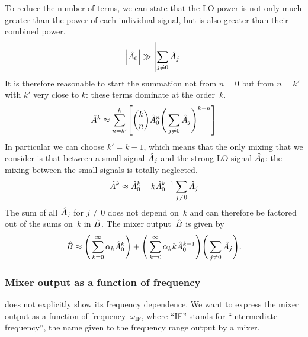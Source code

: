 To reduce the number of terms, we can state that the LO power is not only much greater than the power of each individual signal, but is also greater than their combined power.
\[
    \abs{\cp{A}_0} \gg \abs{\sum_{j \ne 0} \cp{A}_j}
\]
It is therefore reasonable to start the summation not from $n=0$ but from $n=k'$ with $k'$ very close to $k$: these terms dominate at the order~$k$.
\[
    \cp{A}^k
    \approx
    \sum_{n=k'}^{k}
    \left[
    \binom{k}{n} 
    \cp{A}_0^n 
    \Bigg(
        \sum_{j \ne 0}
        \cp{A}_j
    \Bigg)^{k-n}
    \right]
\]
In particular we can choose $k' = k-1$, which means that the only mixing that we consider is that between a small signal $\hat{A}_j$ and the strong LO signal $\hat{A}_0$: the mixing between the small signals is totally neglected.
\begin{equation}
    \hat{A}^k
    \approx
    \hat{A}_0^k
    +
    k
    \hat{A}_0^{k-1}
    \sum_{j \ne 0}
    \hat{A}_j
\end{equation}
The sum of all $\hat{A}_j$ for $j \ne 0$ does not depend on~$k$ and can therefore be factored out of the sums on~$k$ in $\hat{B}$.
The mixer output~$\hat{B}$ is given by
\begin{equation}
    \hat{B}
    \approx
    \Bigg(
            \sum_{k=0}^{\infty}
            \alpha_k
            \hat{A}_0^k
    \Bigg)
    +
    \Bigg(
            \sum_{k=0}^{\infty}
            \alpha_k
            k
            \hat{A}_0^{k-1}
    \Bigg)
    \Bigg(
        \sum_{j \ne 0}
        \hat{A}_j
    \Bigg)
    \text{.}
    \label{eq:mixer_output}
\end{equation}



\subsubsection{Mixer output as a function of frequency}

 does not explicitly show its frequency dependence.
We want to express the mixer output as a function of frequency~$\omega_\text{IF}$, where ``IF'' stands for ``intermediate frequency'', the name given to the frequency range output by a mixer.

